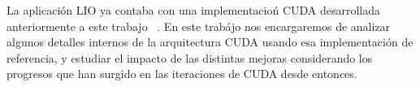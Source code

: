 La aplicaci\'on LIO ya contaba con una implementacio\'n CUDA desarrollada anteriormente a este
trabajo ~\cite{TesisNitsche}. En este trab\'ajo nos encargaremos de analizar algunos detalles internos de
la arquitectura CUDA usando esa implementaci\'on de referencia, y estudiar el impacto de las distintas
mejoras considerando los progresos que han surgido en las iteraciones de CUDA desde entonces.

